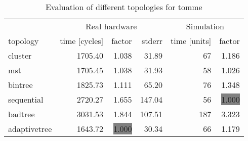 \begin{table}[htb]
  \centering
  \begin{tabular}{lrrrrr}
  \toprule
  & \multicolumn{3}{c}{Real hardware} & \multicolumn{2}{c}{Simulation} \\
  topology & time [cycles] & factor & stderr & time [units] & factor \\
  \midrule
  cluster & 1705.40 & 1.038 & 31.89 & 67 & 1.186 \\
  mst & 1705.45 & 1.038 & 31.93 & 58 & 1.026 \\
  bintree & 1825.73 & 1.111 & 65.20 & 76 & 1.348 \\
  sequential & 2720.27 & 1.655 & 147.04 & 56 & \colorbox{gray}{1.000} \\
  badtree & 3031.53 & 1.844 & 107.51 & 187 & 3.323 \\
  adaptivetree & 1643.72 & \colorbox{gray}{1.000} & 30.34 & 66 & 1.179 \\
  \midrule
  \end{tabular}
  \caption{Evaluation of different topologies for tomme}
  \label{tab:tomme}
\end{table}

